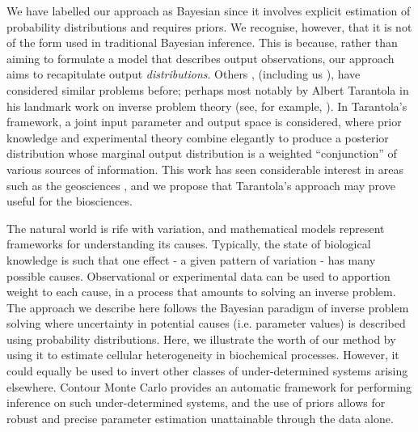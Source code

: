 We have labelled our approach as Bayesian since it involves explicit estimation of probability distributions and requires priors. We recognise, however, that it is not of the form used in traditional Bayesian inference. This is because, rather than aiming to formulate a model that describes output observations, our approach aims to recapitulate output \emph{distributions}. Others \cite{BJW-18}, (including us \cite{lambert2018inverse}), have considered similar problems before; perhaps most notably by Albert Tarantola in his landmark work on inverse problem theory (see, for example, \cite{tarantola2005inverse}). In Tarantola's framework, a joint input parameter and output space is considered, where prior knowledge and experimental theory combine elegantly to produce a posterior distribution whose marginal output distribution is a weighted ``conjunction'' of various sources of information. This work has seen considerable interest in areas such as the geosciences \cite{mosegaard1995monte,vukicevic2008analysis}, and we propose that Tarantola's approach may prove useful for the biosciences.


The natural world is rife with variation, and mathematical models represent frameworks for understanding its causes. Typically, the state of biological knowledge is such that one effect - a given pattern of variation - has many possible causes. Observational or experimental data can be used to apportion weight to each cause, in a process that amounts to solving an inverse problem. The approach we describe here follows the Bayesian paradigm of inverse problem solving where uncertainty in potential causes (i.e. parameter values) is described using probability distributions. Here, we illustrate the worth of our method by using it to estimate cellular heterogeneity in biochemical processes. However, it could equally be used to invert other classes of under-determined systems arising elsewhere. Contour Monte Carlo provides an automatic framework for performing inference on such under-determined systems, and the use of priors allows for robust and precise parameter estimation unattainable through the data alone.

